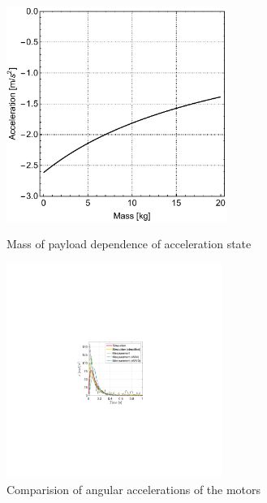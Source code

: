 \documentclass[12pt,english,twoside]{article}
\begin{document}
\begin{figure}[htb!]
	\centering
	\includegraphics[height=7cm]{figures/massDep}
	\caption{Mass of payload dependence of acceleration state}
	\label{massDep}
	\endminipage\hfill
	\centering
	\includegraphics[height=7cm]{figures/epsilonCompare}
	\caption{Comparision of angular accelerations of the motors}
	\label{epsCompare}
	\endminipage\hfill
\end{figure}
\end{document}
